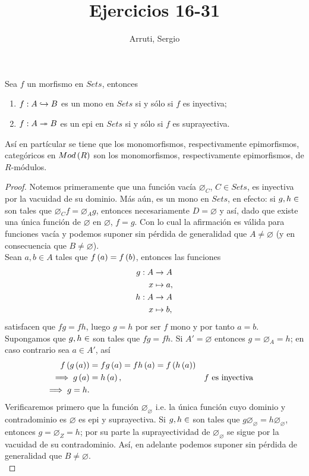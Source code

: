 \documentclass{article}
\title{Ejercicios 16-31}
\author{Arruti, Sergio}
\date{}
\begin{document}
	\maketitle
	\begin{lem}
		Sea $f$ un morfismo en $Sets$, entonces
		\begin{enumerate}[label=$\alph*)$]
			\item $\catarrow{f}{A}{B}{m}$ es un mono en $Sets$ si y sólo si $f$ es inyectiva;
			\item $\catarrow{f}{A}{B}{e}$ es un epi en $Sets$ si y sólo si $f$ es suprayectiva.
		\end{enumerate}
		Así en partícular se tiene que los monomorfismos, respectivamente epimorfismos, categóricos en $Mod\left(R\right)$ son los monomorfismos, respectivamente epimorfismos, de $R$-módulos.
		\begin{proof}
			 Notemos primeramente que una función vacía $\varnothing_C$, $C\in Sets$, es inyectiva por la vacuidad de su dominio. Más aún, es un mono en $Sets$, en efecto: si $g,h\in\ringmod{Sets}{D}{\varnothing}$ son tales que $\varnothing_C f=\varnothing_A g$, entonces necesariamente $D=\varnothing$ y así, dado que existe una única función de $\varnothing$ en $\varnothing$, $f=g$. Con lo cual la afirmación es válida para funciones vacía y podemos suponer sin pérdida de generalidad que $A\neq\varnothing$ (y en consecuencia que $B\neq\varnothing$).\\
			 Sean $a,b\in A$ tales que $f\left(a\right)=f\left(b\right)$, entonces las funciones
			\begin{align*}
				g: A &\rightarrow A\\ x &\mapsto a,\\
				h: A &\rightarrow A\\ x &\mapsto b,
			\end{align*}
			satisfacen que $fg=fh$, luego $g=h$ por  ser $f$ mono y por tanto $a=b$.\\
			 Supongamos que  $g,h\in\ringmod{Sets}{A'}{A}$ son tales que $fg=fh$. Si $A'=\varnothing$ entonces $g=\varnothing_A=h$; en caso contrario sea $a\in A'$, así
			\begin{align*}
				f\left(g\left(a\right)\right)&=fg\left(a\right)=fh\left(a\right)=f\left(h\left(a\right)\right)\\
				\implies g\left(a\right)&=h\left(a\right), && f\text{ es inyectiva}\\
				\implies g=h.
			\end{align*}
			 Verificaremos primero que la función $\varnothing_\varnothing$ i.e. la única función cuyo dominio y contradominio es $\varnothing$ es epi y suprayectiva. Si  $g,h\in\ringmod{Sets}{\varnothing}{Z}$ son tales que $g\varnothing_\varnothing=h\varnothing_\varnothing$, entonces $g=\varnothing_Z=h$; por su parte la suprayectividad de $\varnothing_\varnothing$ se sigue por la vacuidad de su contradominio. Así, en adelante podemos suponer sin pérdida de generalidad que $B\neq\varnothing$.\\

\end{proof}
\end{lem}
\end{document}
